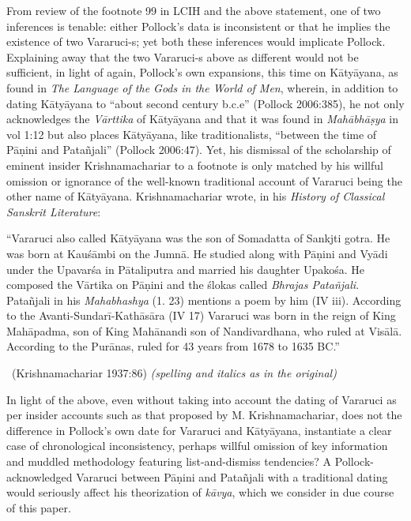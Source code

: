 From review of the footnote 99 in LCIH and the above statement, one of two inferences is tenable: either Pollock’s data is inconsistent or that he implies the existence of two Vararuci-s; yet both these inferences would implicate Pollock. Explaining away that the two Vararuci-s above as different would not be sufficient, in light of again, Pollock’s own expansions, this time on Kātyāyana, as found in \textit{The Language of the Gods in the World of Men}, wherein, in addition to dating Kātyāyana to “about second century b.c.e” (Pollock 2006:385), he not only acknowledges the \textit{Vārttika} of Kātyāyana and that it was found in \textit{Mahābhāṣya} in vol 1:12 but also places Kātyāyana, like traditionalists, “between the time of Pāṇini and Patañjali” (Pollock 2006:47). Yet, his dismissal of the scholarship of eminent insider Krishnamachariar to a footnote is only matched by his willful omission or ignorance of the well-known traditional account of Vararuci being the other name of Kātyāyana. Krishnamachariar wrote, in his \textit{History of Classical Sanskrit Literature}:

\begin{myquote}
“Vararuci also called Kātyāyana was the son of Somadatta of Sankjti gotra. He was born at Kauśāmbi on the Jumnā. He studied along with Pāṇini and Vyādi under the Upavarśa in Pātaliputra and married his daughter Upakośa. He composed the Vārtika on Pāṇini and the ślokas called \textit{Bhrajas Patañjali}. Patañjali in his \textit{Mahabhashya} (1. 23) mentions a poem by him (IV iii). According to the Avanti-Sundarī-Kathāsāra (IV 17) Vararuci was born in the reign of King Mahāpadma, son of King Mahānandi son of Nandivardhana, who ruled at Visālā. According to the Purānas, ruled for 43 years from 1678 to 1635 BC.” 

~\hfill (Krishnamachariar 1937:86) \textit{(spelling and italics as in the original)}
\end{myquote}

In light of the above, even without taking into account the dating of Vararuci as per insider accounts such as that proposed by M. Krishnamachariar, does not the difference in Pollock’s own date for Vararuci and Kātyāyana, instantiate a clear case of chronological inconsistency, perhaps willful omission of key information and muddled methodology featuring list-and-dismiss tendencies? A Pollock-acknowledged Vararuci between Pāṇini and Patañjali with a traditional dating would seriously affect his theorization of \textit{kāvya}, which we consider in due course of this paper.


